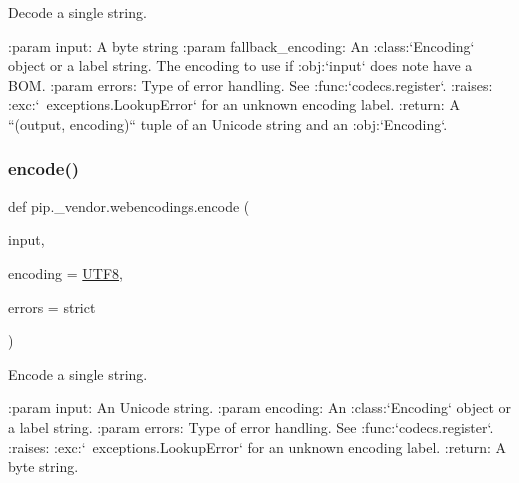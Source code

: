 \begin{DoxyVerb}Decode a single string.

:param input: A byte string
:param fallback_encoding:
    An :class:`Encoding` object or a label string.
    The encoding to use if :obj:`input` does note have a BOM.
:param errors: Type of error handling. See :func:`codecs.register`.
:raises: :exc:`~exceptions.LookupError` for an unknown encoding label.
:return:
    A ``(output, encoding)`` tuple of an Unicode string
    and an :obj:`Encoding`.\end{DoxyVerb}
 \mbox{\label{namespacepip_1_1__vendor_1_1webencodings_af737f45c9207721a90c25219dbc89288}} 
\subsubsection{\texorpdfstring{encode()}{encode()}}
{\footnotesize\ttfamily def pip.\+\_\+vendor.\+webencodings.\+encode (\begin{DoxyParamCaption}\item[{}]{input,  }\item[{}]{encoding = {\ttfamily \hyperlink{namespacepip_1_1__vendor_1_1webencodings_a2eb014d3f6305ba50ece3cad231b60bf}{U\+T\+F8}},  }\item[{}]{errors = {\ttfamily \textquotesingle{}strict\textquotesingle{}} }\end{DoxyParamCaption})}

\begin{DoxyVerb}Encode a single string.

:param input: An Unicode string.
:param encoding: An :class:`Encoding` object or a label string.
:param errors: Type of error handling. See :func:`codecs.register`.
:raises: :exc:`~exceptions.LookupError` for an unknown encoding label.
:return: A byte string.\end{DoxyVerb}
 \mbox{\label{namespacepip_1_1__vendor_1_1webencodings_a45fec086851d9f7d2af7ae7715dfa50c}} 
